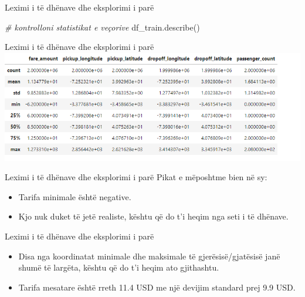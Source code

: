 \documentclass[
  ignorenonframetext,
]{beamer}
\newenvironment{Shaded}{\begin{snugshade}}{\end{snugshade}}
\newcommand{\CommentTok}[1]{\textcolor[rgb]{0.56,0.35,0.01}{\textit{#1}}}
\newcommand{\NormalTok}[1]{#1}
\begin{document}
\begin{frame}[fragile]{Leximi i të dhënave dhe eksplorimi i parë}
\protect\hypertarget{leximi-i-tuxeb-dhuxebnave-dhe-eksplorimi-i-paruxeb-6}{}

\begin{Shaded}
\begin{Highlighting}[]
\CommentTok{\# kontrolloni statistikat e veçorive}
\NormalTok{df\_train.describe()}
\end{Highlighting}
\end{Shaded}
\end{frame}

\begin{frame}{Leximi i të dhënave dhe eksplorimi i parë}
\protect\hypertarget{leximi-i-tuxeb-dhuxebnave-dhe-eksplorimi-i-paruxeb-7}{}
\includegraphics{./Figs/train2.png}
\end{frame}

\begin{frame}{Leximi i të dhënave dhe eksplorimi i parë}
\protect\hypertarget{leximi-i-tuxeb-dhuxebnave-dhe-eksplorimi-i-paruxeb-8}{}
Pikat e mëposhtme bien në sy:

\begin{itemize}
\item
  Tarifa minimale është negative.
\item
  Kjo nuk duket të jetë realiste, kështu që do t'i heqim nga seti i të
  dhënave.
\end{itemize}
\end{frame}

\begin{frame}{Leximi i të dhënave dhe eksplorimi i parë}
\protect\hypertarget{leximi-i-tuxeb-dhuxebnave-dhe-eksplorimi-i-paruxeb-9}{}
\begin{itemize}
\item
  Disa nga koordinatat minimale dhe maksimale të gjerësisë/gjatësisë
  janë shumë të largëta, kështu që do t'i heqim ato gjithashtu.
\item
  Tarifa mesatare është rreth 11.4 USD me një devijim standard prej 9.9
  USD.
\end{itemize}
\end{frame}
\end{document}
